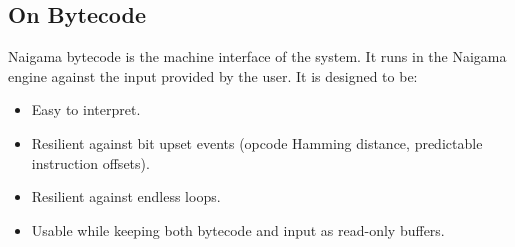 \subsection{On Bytecode}

Naigama bytecode is the machine interface of the system.
It runs in the Naigama engine against the input provided by the user.
It is designed to be:

\begin{itemize}

\item Easy to interpret.
\item Resilient against bit upset events (opcode Hamming distance,
      predictable instruction offsets).
\item Resilient against endless loops.
\item Usable while keeping both bytecode and input as read-only buffers.

\end{itemize}
